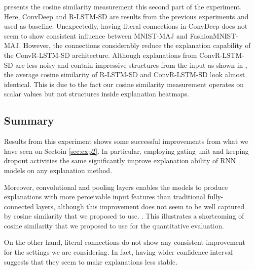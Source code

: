\addfigure{\ref{fig:rel_dist_convdeep_trans_exp}} presents the cosine similarity measurement this second part of the experiment. Here, ConvDeep and R-LSTM-SD are results from the previous experiments and used as baseline. Unexpectedly, having literal connections in ConvDeep does not seem to show consistent influence between MNIST-MAJ and FashionMNIST-MAJ. However, the connections considerably reduce the explanation capability of the ConvR-LSTM-SD architecture. 
 Although explanations from ConvR-LSTM-SD are less noisy and contain impressive structures from the input as shown in \addfigure{\ref{fig:heatmap_msc_convrlstm_pos_rel}}, the average cosine similarity of R-LSTM-SD and ConvR-LSTM-SD look almost identical. This is due to the fact our cosine similarity measurement operates on scalar values but not structures inside explanation heatmaps.
 

\clearpage

\subsection{Summary}
Results from this experiment shows some successful improvements from what we have seen on Sectoin \ref{sec:exp2}. In particular, employing gating unit and keeping dropout activities the same significantly improve explanation ability of RNN models on any explanation method.  

Moreover, convolutional and pooling layers enables the models to produce explanations with more perceivable input features than traditional fully-connected layers, although this improvement does not seem to be well captured by cosine similarity that we proposed to use. . This illustrates  a shortcoming of cosine similarity that we proposed to use for the quantitative evaluation.

On the other hand, literal connections do not show any consistent improvement for the settings we are considering. In fact, having wider confidence interval suggests that they seem to make explanations less stable.
